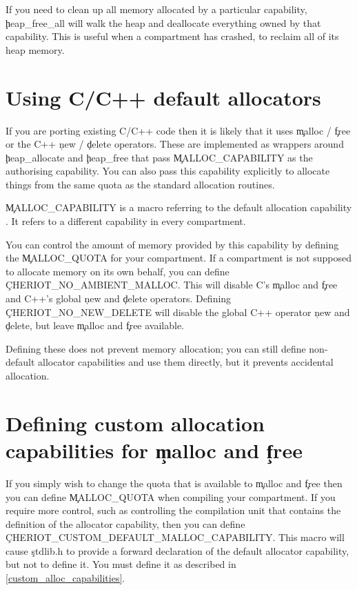If you need to clean up all memory allocated by a particular capability, \c{heap_free_all} will walk the heap and deallocate everything owned by that capability.
This is useful when a compartment has crashed, to reclaim all of its heap memory.


\section{Using C/C++ default allocators}

If you are porting existing C/C++ code then it is likely that it uses \c{malloc} / \c{free} or the C++ \c{new} / \c{delete} operators.
These are implemented as wrappers around \c{heap_allocate} and \c{heap_free} that pass \c{MALLOC_CAPABILITY} as the authorising capability.
You can also pass this capability explicitly to allocate things from the same quota as the standard allocation routines.

\begin{note}
	\c{MALLOC_CAPABILITY} is a macro referring to the default allocation capability .
	It refers to a different capability in every compartment.
\end{note}

You can control the amount of memory provided by this capability by defining the \c{MALLOC_QUOTA} for your compartment.
If a compartment is not supposed to allocate memory on its own behalf, you can define \c{CHERIOT_NO_AMBIENT_MALLOC}.
This will disable C's \c{malloc} and \c{free} and C++'s global \c{new} and \c{delete} operators.
Defining \c{CHERIOT_NO_NEW_DELETE} will disable the global C++ operator \c{new} and \c{delete}, but leave \c{malloc} and \c{free} available.

Defining these does not prevent memory allocation; you can still define non-default allocator capabilities and use them directly, but it prevents accidental allocation.

\section{Defining custom allocation capabilities for \c{malloc} and \c{free}}

If you simply wish to change the quota that is available to \c{malloc} and \c{free} then you can define \c{MALLOC_QUOTA} when compiling your compartment.
If you require more control, such as controlling the compilation unit that contains the definition of the allocator capability, then you can define \c{CHERIOT_CUSTOM_DEFAULT_MALLOC_CAPABILITY}.
This macro will cause \c{stdlib.h} to provide a forward declaration of the default allocator capability, but not to define it.
You must define it as described in \ref{custom_alloc_capabilities}.

